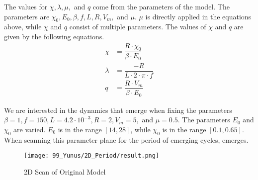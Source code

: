 
The values for $\chi, \lambda, \mu,$ and $q$ come from the parameters of the model.
The parameters are $\chi_0, E_0, \beta, f, L, R, V_m,$ and $\mu$.
$\mu$ is directly applied in the equations above, while $\chi$ and $q$ consist of multiple parameters.
The values of $\chi$ and $q$ are given by the following equations.
\begin{align}
    \chi & = \dfrac{R \cdot \chi_0}{\beta \cdot E_0} \\
    \lambda & = \dfrac{-R}{L \cdot 2 \cdot \pi \cdot f} \\
    q & = \dfrac{R \cdot V_m}{\beta \cdot E_0}
\end{align}

We are interested in the dynamics that emerge when fixing the parameters $\beta = 1, f = 150, L = 4.2 \cdot 10^{-3}, R = 2, V_m = 5,$ and $\mu = 0.5$.
The parameters $E_0$ and $\chi_0$ are varied.
$E_0$ is in the range $[14, 28]$, while $\chi_0$ is in the range $[0.1, 0.65]$.
When scanning this parameter plane for the period of emerging cycles,  emerges.

\begin{figure}
    \centering
    \texttt{[image: 99\_Yunus/2D\_Period/result.png]}
    \caption{2D Scan of Original Model}
    \label{fig:yunus.2pi.2d.full}
\end{figure}

